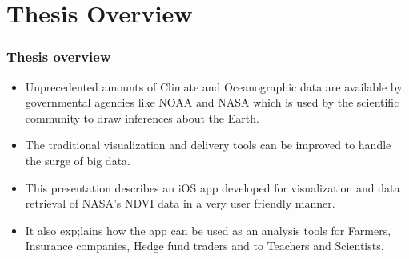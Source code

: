 

\section{Thesis Overview}
\begin{frame}
\frametitle{Thesis overview}
\begin{itemize}

\item Unprecedented amounts of Climate and Oceanographic data are available by governmental agencies like NOAA and NASA which is used by the scientific community to draw inferences about the Earth.

\item The traditional visualization and delivery tools can be improved to handle the surge of big data. 

\item This presentation describes an iOS app developed for visualization and data retrieval of NASA's NDVI data in a very user friendly manner.

\item It also exp;lains how the app can be used as an analysis tools for Farmers, Insurance companies, Hedge fund traders and to Teachers and Scientists.

\end{itemize}
\end{frame}
